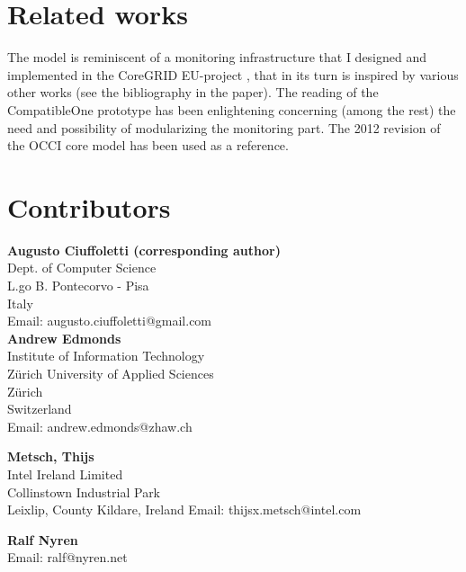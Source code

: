 \documentclass[12pt]{article}  %
\begin{document}
{\begin{description}
\end{description}

\section{Related works}

The model is reminiscent of a monitoring infrastructure that I designed and implemented in the CoreGRID EU-project \cite{cur:08:a}, that in its turn is inspired by various other works (see the bibliography in the paper). The reading of the CompatibleOne prototype \cite{mar12a} has been enlightening concerning (among the rest) the need and possibility of modularizing the monitoring part. The 2012 revision of the OCCI core model \cite{occi:core} has been used as a reference.





\section{Contributors}

\textbf{Augusto Ciuffoletti (corresponding author)} \\
Dept. of Computer Science \\
L.go B. Pontecorvo - Pisa\\
Italy \\
Email: augusto.ciuffoletti@gmail.com \\

\textbf{Andrew Edmonds}\\
Institute of Information Technology \\
Zürich University of Applied Sciences \\
Zürich \\
Switzerland \\
Email: andrew.edmonds@zhaw.ch

\textbf{Metsch, Thijs} \\
Intel Ireland Limited \\
Collinstown Industrial Park \\
Leixlip, County Kildare, Ireland
Email: thijsx.metsch@intel.com

\textbf{Ralf Nyren} \\
Email: ralf@nyren.net 


}
\end{document}
